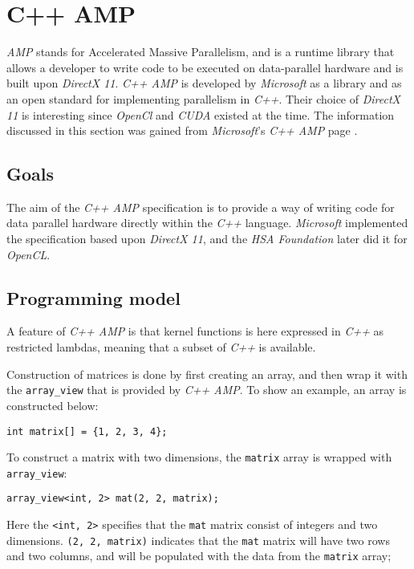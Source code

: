 \section{C++ AMP} \label{cha:cppAmpRelWork}
\textit{AMP} stands for Accelerated Massive Parallelism, and is a runtime library that allows a developer to write code to be executed on data-parallel hardware and is built upon \textit{DirectX 11}. \textit{C++ AMP} is developed by \textit{Microsoft} as a library and as an open standard for implementing parallelism in \textit{C++}. Their choice of \textit{DirectX 11} is interesting since \textit{OpenCl} and \textit{CUDA} existed at the time. The information discussed in this section was gained from \textit{Microsoft}'s \textit{C++ AMP} page \cite{microsoftCppAMP}.


\subsection{Goals}
The aim of the \textit{C++ AMP} specification is to provide a way of writing code for data parallel hardware directly within the \textit{C++} language. \textit{Microsoft} implemented the specification based upon \textit{DirectX 11}, and the \textit{HSA Foundation} later did it for \textit{OpenCL}.

\subsection{Programming model}
A feature of \textit{C++ AMP} is that kernel functions is here expressed in \textit{C++} as restricted lambdas, meaning that a subset of \textit{C++} is available. 

Construction of matrices is done by first creating an array, and then wrap it with the \texttt{array\_view} that is provided by \textit{C++ AMP}. To show an example, an array is constructed below:
\begin{lstlisting}
int matrix[] = {1, 2, 3, 4}; 
\end{lstlisting}
To construct a matrix with two dimensions, the \texttt{matrix} array is wrapped with \texttt{array\_view}:
\begin{lstlisting}
array_view<int, 2> mat(2, 2, matrix); 
\end{lstlisting}
Here the \texttt{<int, 2>} specifies that the \texttt{mat} matrix consist of integers and two dimensions. \texttt{(2, 2, matrix)} indicates that the \texttt{mat} matrix will have two rows and two columns, and will be populated with the data from the \texttt{matrix} array;

